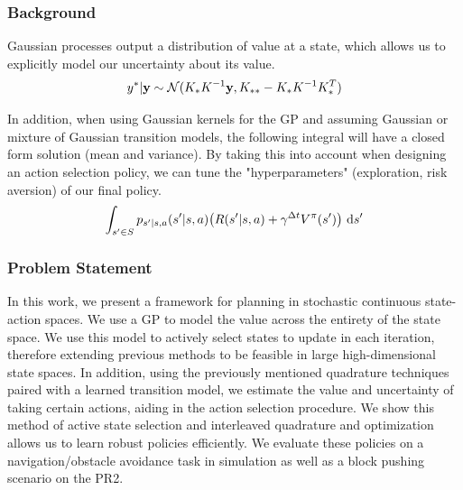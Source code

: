 \documentclass[8pt]{beamer}
\begin{document}
\begin{frame}
\frametitle{Background}
Gaussian processes output a distribution of value at a state, which allows us to explicitly model our uncertainty about its value.
\begin{equation*}    %
	y^{*}|\bold{y} \sim \mathcal{N}(K_{*}K^{-1}\bold{y}, K_{**} - K_{*}K^{-1}K_{*}^{T})
\end{equation*}

In addition, when using Gaussian kernels for the GP and assuming Gaussian or mixture of Gaussian transition models, the following integral will have a closed form solution (mean and variance). By taking this into account when designing an action selection policy, we can tune the "hyperparameters" (exploration, risk aversion) of our final policy.
\begin{equation*}    %
        \int_{s' \in S} p_{s'|s,a}(s'|s,a)\big(R(s'|s,a) + \gamma^{\Delta t}V^{\pi}(s')\big) \ \textup{d}s'
\end{equation*}
\end{frame}

\begin{frame}
\frametitle{Problem Statement}
In this work, we present a framework for planning in stochastic continuous state-action spaces. We use a GP to model the value across the entirety of the state space. We use this model to actively select states to update in each iteration, therefore extending previous methods to be feasible in large high-dimensional state spaces. In addition, using the previously mentioned quadrature techniques paired with a learned transition model, we estimate the value and uncertainty of taking certain actions, aiding in the action selection procedure. We show this method of active state selection and interleaved quadrature and optimization allows us to learn robust policies efficiently. We evaluate these policies on a navigation/obstacle avoidance task in simulation as well as a block pushing scenario on the PR2.
\end{frame}
\end{document}
